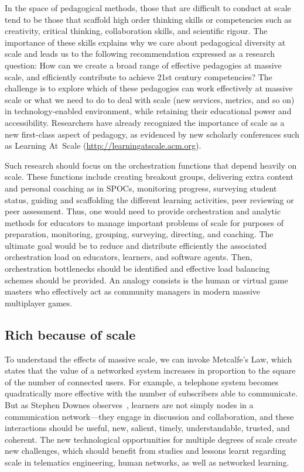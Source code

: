 In the space of pedagogical methods, those that are difficult to conduct
at scale tend to be those that scaffold high order thinking skills or
competencies such as creativity, critical thinking, collaboration
skills, and scientific rigour.  The importance of these skills explains
why we care about pedagogical diversity at scale and leads us to the
following recommendation expressed as a research question: How can we
create a broad range of effective pedagogies at massive scale, and
efficiently contribute to achieve 21st century competencies? The
challenge is to explore which of these pedagogies can work effectively
at massive scale or what we need to do to deal with scale (new services,
metrics, and so on) in technology-enabled environment, while retaining their
educational power and accessibility.  Researchers have already
recognized the importance of scale as a new first-class aspect of
pedagogy, as evidenced by new scholarly conferences such as Learning
At~Scale (\url{http://learningatscale.acm.org}).

Such research should focus on the orchestration functions that depend heavily
on scale. These functions include creating breakout groups, delivering
extra content and personal coaching as in SPOCs, monitoring progress,
surveying student status, guiding and scaffolding the different learning
activities, peer reviewing or peer assessment. Thus, one would need to
provide orchestration and analytic methods for educators to manage
important problems of scale for purposes of preparation, monitoring,
grouping, surveying, directing, and coaching. The ultimate goal would be
to reduce and distribute efficiently the associated orchestration load
on educators, learners, and software agents. Then, orchestration
bottlenecks should be identified and effective load balancing schemes
should be provided. An analogy consists is 
the human or virtual game masters who effectively act as community
managers in modern 
massive multiplayer games.

\subsection{Rich because of scale}

To understand the effects of massive scale, we can invoke
Metcalfe's Law, which states that the value of a networked system
increases in proportion to the square of the number of connected users.
For example, a telephone system becomes quadratically more 
effective with the number of subscribers able to communicate. But as
Stephen Downes observes~\cite{downes-personal-network-effect-2007},
learners are not simply nodes in a communication network---they engage
in discussion and collaboration, and these interactions should be
useful, new, salient, timely, understandable, trusted, and coherent. The
new technological opportunities for multiple degrees of scale create new
challenges, which should benefit from studies and lessons learnt
regarding scale in telematics engineering, human networks, as well as
networked learning.

